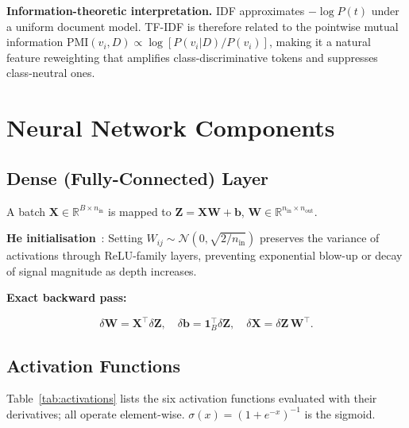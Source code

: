 \documentclass[10pt,conference,letterpaper]{IEEEtran}
\newcommand{\R}{\mathbb{R}}
\begin{document}
\textbf{Information-theoretic interpretation.} IDF approximates $-\log P(t)$ under
a uniform document model. TF-IDF is therefore related to the pointwise mutual
information $\mathrm{PMI}(v_i, D) \propto \log[P(v_i|D)/P(v_i)]$, making it a
natural feature reweighting that amplifies class-discriminative tokens and suppresses
class-neutral ones.

\section{Neural Network Components}
\label{sec:nn}

\subsection{Dense (Fully-Connected) Layer}

A batch $\bm{X}\in\R^{B\times n_\text{in}}$ is mapped to
$\bm{Z}=\bm{X}\bm{W}+\bm{b}$, $\bm{W}\in\R^{n_\text{in}\times n_\text{out}}$.

\textbf{He initialisation}~\cite{he2015delving}: Setting
$W_{ij}\!\sim\!\mathcal{N}(0,\sqrt{2/n_\text{in}})$
preserves the variance of activations through ReLU-family layers, preventing
exponential blow-up or decay of signal magnitude as depth increases.

\textbf{Exact backward pass:}
\begin{tcolorbox}[eqbox]
\[
  \delta\bm{W} = \bm{X}^\top\delta\bm{Z},\quad
  \delta\bm{b} = \mathbf{1}_B^\top\delta\bm{Z},\quad
  \delta\bm{X} = \delta\bm{Z}\,\bm{W}^\top.
\]
\end{tcolorbox}

\subsection{Activation Functions}

Table~\ref{tab:activations} lists the six activation functions evaluated with their
derivatives; all operate element-wise. $\sigma(x)=(1+e^{-x})^{-1}$ is the sigmoid.
\end{document}
